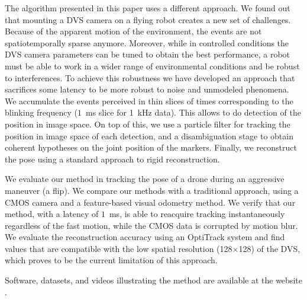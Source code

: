 The algorithm presented in this paper uses a different approach. We
found out that mounting a DVS camera on a flying robot creates a new
set of challenges. Because of the apparent motion of the environment,
the events are not spatiotemporally sparse anymore. Moreover, while
in controlled conditions the DVS camera parameters can be tuned to
obtain the best performance, a robot must be able to work in a wider
range of environmental conditions and be robust to interferences.
To achieve this robustness we have developed an approach that sacrifices
some latency to be more robust to noise and unmodeled phenomena. We
accumulate the events perceived in thin slices of times corresponding
to the blinking frequency ($1$~ms slice for 1~kHz data). This allows
to do detection of the \ALMs position in image space. On top of this,
we use a particle filter for tracking the position in image space
of each detection, and a disambiguation stage to obtain coherent hypotheses
on the joint position of the markers. Finally, we reconstruct the
pose using a standard approach to rigid reconstruction.

We evaluate our method in tracking the pose of a drone during an aggressive
maneuver (a flip). We compare our methods with a traditional approach,
using a CMOS camera and a feature-based visual odometry method. We
verify that our method, with a latency of $1$~ms, is able to reacquire
tracking instantaneously regardless of the fast motion, while the
CMOS data is corrupted by motion blur. We evaluate the reconstruction
accuracy using an OptiTrack system and find values that are compatible
with the low spatial resolution (128$\times$128) of the DVS, which
proves to be the current limitation of this approach.



Software, datasets, and videos illustrating the method are available
at the website \myurl.

